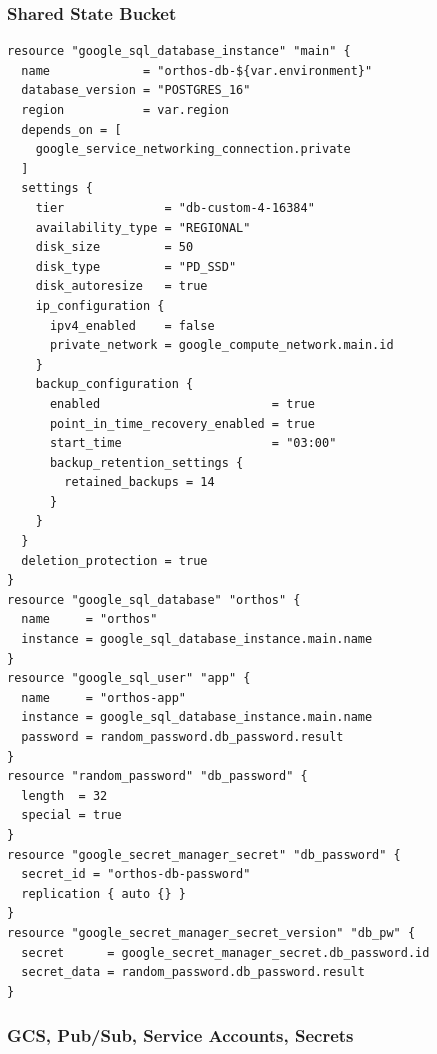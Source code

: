 \documentclass[11pt,a4paper]{article}
\begin{document}
\subsubsection{Shared State Bucket}

\begin{lstlisting}[language=hcl]
resource "google_sql_database_instance" "main" {
  name             = "orthos-db-${var.environment}"
  database_version = "POSTGRES_16"
  region           = var.region
  depends_on = [
    google_service_networking_connection.private
  ]
  settings {
    tier              = "db-custom-4-16384"
    availability_type = "REGIONAL"
    disk_size         = 50
    disk_type         = "PD_SSD"
    disk_autoresize   = true
    ip_configuration {
      ipv4_enabled    = false
      private_network = google_compute_network.main.id
    }
    backup_configuration {
      enabled                        = true
      point_in_time_recovery_enabled = true
      start_time                     = "03:00"
      backup_retention_settings {
        retained_backups = 14
      }
    }
  }
  deletion_protection = true
}
resource "google_sql_database" "orthos" {
  name     = "orthos"
  instance = google_sql_database_instance.main.name
}
resource "google_sql_user" "app" {
  name     = "orthos-app"
  instance = google_sql_database_instance.main.name
  password = random_password.db_password.result
}
resource "random_password" "db_password" {
  length  = 32
  special = true
}
resource "google_secret_manager_secret" "db_password" {
  secret_id = "orthos-db-password"
  replication { auto {} }
}
resource "google_secret_manager_secret_version" "db_pw" {
  secret      = google_secret_manager_secret.db_password.id
  secret_data = random_password.db_password.result
}
\end{lstlisting}

\subsubsection{GCS, Pub/Sub, Service Accounts, Secrets}
\end{document}
